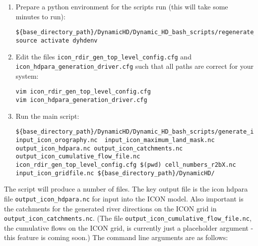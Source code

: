 \documentclass{article}
\begin{document}
\begin{enumerate}
\begin{lstlisting}[style=bash_input,breaklines=true]
cd hdpara_gen_workdir 
scp username@login1.mpimet.mpg.de:/home/mpim/m300468/mk_ic_rdirs/cell_numbers_r2bX.nc $(pwd)
scp username@login1.mpimet.mpg.de:/home/mpim/m300468/mk_ic_rdirs/icon_rdir_gen_top_level_config.cfg $(pwd)
scp username@login1.mpimet.mpg.de:/home/mpim/m300468/mk_ic_rdirs/icon_hdpara_generation_driver.cfg $(pwd)
scp username@login1.mpimet.mpg.de:/home/mpim/m300468/mk_ic_rdirs/corrected_orog_intermediary_ICE5G_and_tarasov_upscaled_srtm30plus_north_america_only_data_ALG4_sinkless_glcc_olson_lsmask_0k_20170517_003802.nc $(pwd)
scp username@login1.mpimet.mpg.de:/home/mpim/m300468/mk_ic_rdirs/rdirs_hydrosheds_au_af_sa_upscaled_10min_20200203_163646.nc $(pwd) 
\end{lstlisting}
\item Prepare a python environment for the scripts run (this will take some minutes to run):
\begin{lstlisting}[style=bash_input,breaklines=true]
${base_directory_path}/DynamicHD/Dynamic_HD_bash_scripts/regenerate_conda_environment.sh 
source activate dyhdenv
\end{lstlisting}
\item Edit the files \lstinline[style=bash_input]{icon_rdir_gen_top_level_config.cfg} and \lstinline[style=bash_input]{icon_hdpara_generation_driver.cfg} such that all paths are correct for your system:

\begin{lstlisting}[style=bash_input,breaklines=true]
vim icon_rdir_gen_top_level_config.cfg
vim icon_hdpara_generation_driver.cfg 
\end{lstlisting}

\item Run the main script:
\begin{lstlisting}[style=bash_input,breaklines=true]
${base_directory_path}/DynamicHD/Dynamic_HD_bash_scripts/generate_icon_hdpara_top_level_driver.sh input_icon_orography.nc  input_icon_maximum_land_mask.nc  output_icon_hdpara.nc output_icon_catchments.nc output_icon_cumulative_flow_file.nc icon_rdir_gen_top_level_config.cfg $(pwd) cell_numbers_r2bX.nc input_icon_gridfile.nc ${base_directory_path}/DynamicHD/
\end{lstlisting}
\end{enumerate}
The script will produce a number of files. The key output file is the icon hdpara file  \lstinline[style=bash_input]{output_icon_hdpara.nc} for input into the ICON model. Also important is the catchments for the generated river directions on the ICON grid in  \lstinline[style=bash_input]{output_icon_catchments.nc}. (The file \lstinline[style=bash_input]{output_icon_cumulative_flow_file.nc}, the cumulative flows on the ICON grid, is currently just a placeholder argument - this feature is coming soon.) The command line arguments are as follows:
\end{document}
